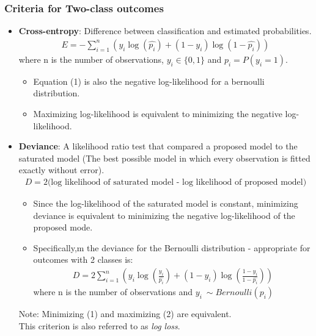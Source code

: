 \documentclass[12pt, oneside]{article}
\begin{document}
\subsubsection{Criteria for Two-class outcomes}
\begin{itemize}
    \item \textbf{Cross-entropy}: Difference between classification and estimated probabilities.
    \begin{align}
        E = - \sum_{i=1}^n (y_i \log (\widehat{p_i}) + (1 - y_i)\log(1- \widehat{p_i}))
    \end{align}
    where n is the number of observations, $y_i \in \{0,1\}$ and $p_i = P(y_i = 1)$.
    \begin{itemize}
        \item Equation (1) is also the negative log-likelihood for a bernoulli distribution. 
        \item Maximizing log-likelihood is equivalent to minimizing the negative log-likelihood.
    \end{itemize}
    
    \item \textbf{Deviance}: A likelihood ratio test that compared a proposed model to the saturated model (The best possible model in which every observation is fitted exactly without error). 
    \begin{align*}
        D = 2(\text{log likelihood of saturated model - log likelihood of proposed model)}
    \end{align*}
    \begin{itemize}
        \item Since the log-likelihood of the saturated model is constant, minimizing deviance is equivalent to minimizing the negative log-likelihood of the proposed mode. 
        \item Specifically,m the deviance for the Bernoulli distribution - appropriate for outcomes with 2 classes is: 
        \begin{align}
            D = 2\sum_{i=1}^n (y_i \log (\frac{y_i}{\widehat{p_i}}) + (1 - y_i)\log(\frac{1 - y_i}{1 - \widehat{p_i}}))
        \end{align}
        where n is the number of observations and $y_i ~ \sim Bernoulli(p_i)$
    \end{itemize}
    Note: Minimizing (1) and maximizing (2) are equivalent.\\
    This criterion is also referred to as \emph{log loss}.
\end{itemize}
\end{document}
